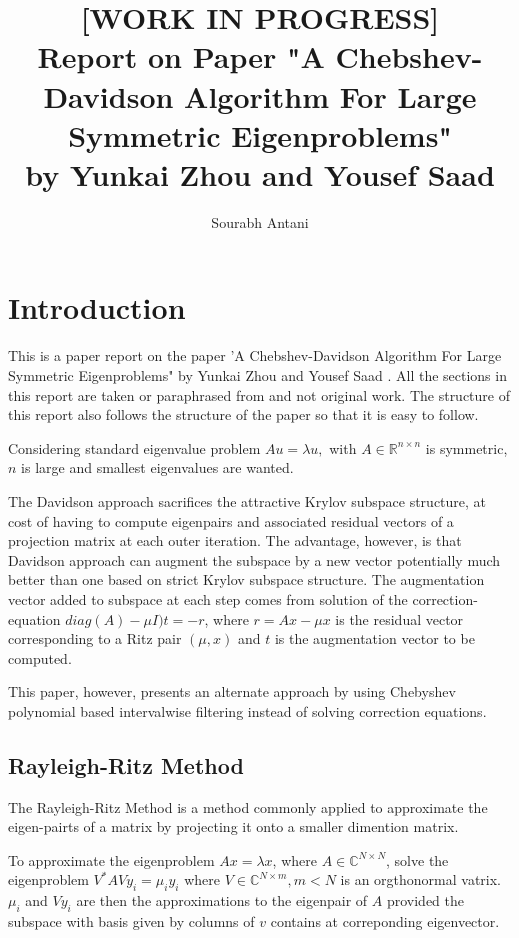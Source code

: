 \documentclass[10pt,a4paper,twoside]{report}
\author{Sourabh Antani}
\title{[WORK IN PROGRESS] \\ Report on Paper "A Chebshev-Davidson Algorithm For Large Symmetric Eigenproblems" \\by Yunkai Zhou and Yousef Saad}
\date{}
\theoremstyle{definition}
\begin{document}
	\maketitle

	\thispagestyle{fancy}
	\chapter{Introduction}
	This is a paper report on the paper 'A Chebshev-Davidson Algorithm For Large Symmetric Eigenproblems" by Yunkai Zhou and Yousef Saad \cite{chebydav07}. All the sections in this report are taken or paraphrased from \cite{chebydav07} and not original work. The structure of this report also follows the structure of the paper so that it is easy to follow.

	Considering standard eigenvalue problem $Au = \lambda u, $ with $A\in \mathbb{R}^{n \times n}$ is symmetric, $n$ is large and smallest eigenvalues are wanted.

	The Davidson approach sacrifices the attractive Krylov subspace structure, at cost of having to compute eigenpairs and associated residual vectors of a projection matrix at each outer iteration. The advantage, however, is that Davidson approach can augment the subspace by a new vector potentially much better than one based on strict Krylov subspace structure. The augmentation vector added to subspace at each step comes from solution of the correction-equation $diag(A) - \mu I)t = -r$, where $r=Ax-\mu x$ is the residual vector corresponding to a Ritz pair $(\mu, x)$ and $t$ is the augmentation vector to be computed. 

	This paper, however, presents an alternate approach by using Chebyshev polynomial based intervalwise filtering instead of solving correction equations.

	\section{Rayleigh-Ritz Method}
	The Rayleigh-Ritz Method \cite{trefethen1997numerical} is a method commonly applied to approximate the eigen-pairts of a matrix by projecting it onto a smaller dimention matrix. 

	To approximate the eigenproblem $Ax = \lambda x$, where $A \in \mathbb{C}^{N\times N}$, solve the eigenproblem $V^{*}AVy_i = \mu_i y_i$ where $V \in \mathbb{C}^{N\times m}, m<N$ is an orgthonormal vatrix. $\mu_i$ and $Vy_i$ are then the approximations to the eigenpair of $A$ provided the subspace with basis given by columns of $v$ contains at correponding eigenvector.
\end{document}
